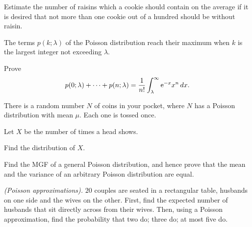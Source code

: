 \begin{problem}[Handout 10, \# 9]
  Estimate the number of raisins which a cookie should contain on the
  average if it is desired that not more than one cookie out of a hundred
  should be without raisin.
\end{problem}
\begin{solution*}

\end{solution*}

\begin{problem}[Handout 10, \# 10]
  The terms \(p(k;\lambda)\) of the Poisson distribution reach their
  maximum when \(k\) is the largest integer not exceeding \(\lambda\).
\end{problem}
\begin{solution*}

\end{solution*}

\begin{problem}[Handout 10, \# 11]
  Prove
  \[
    p(0;\lambda)+\dotsb+p(n;\lambda) =\frac{1}{n!}\int_\lambda^\infty
    \mathrm{e}^{-x}x^n\mathop{}\!d x.
  \]
\end{problem}
\begin{solution*}

\end{solution*}

\begin{problem}[Handout 10, \# 12]
  There is a random number \(N\) of coins in your pocket, where \(N\) has a
  Poisson distribution with mean \(\mu\). Each one is tossed once.

  \noindent Let \(X\) be the number of times a head shows.

  \noindent Find the distribution of \(X\).
\end{problem}
\begin{solution*}

\end{solution*}

\begin{problem}[Handout 10, \# 14]
  Find the MGF of a general Poisson distribution, and hence prove that the
  mean and the variance of an arbitrary Poisson distribution are equal.
\end{problem}
\begin{solution*}

\end{solution*}

\begin{problem}[Handout 10, \# 17 (a)]
  \emph{(Poisson approximations).} \(20\) couples are seated in a
  rectangular table, husbands on one side and the wives on the
  other. First, find the expected number of husbands that sit directly
  across from their wives. Then, using a Poisson approximation, find the
  probability that two do; three do; at most five do.
\end{problem}
\begin{solution*}

\end{solution*}

